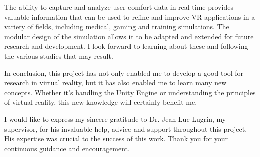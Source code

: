 \documentclass[american]{acmtog} %
\begin{document}
The ability to capture and analyze user comfort data in real time provides valuable information that can be used to refine and improve VR applications in a variety of fields, including medical, gaming and training simulations. The modular design of the simulation allows it to be adapted and extended for future research and development. I look forward to learning about these and following the various studies that may result.

In conclusion, this project has not only enabled me to develop a good tool for research in virtual reality, but it has also enabled me to learn many new concepts. Whether it's handling the Unity Engine or understanding the principles of virtual reality, this new knowledge will certainly benefit me.

\begin{acks}
I would like to express my sincere gratitude to Dr. Jean-Luc Lugrin, my supervisor, for his invaluable help, advice and support throughout this project. His expertise was crucial to the success of this work. Thank you for your continuous guidance and encouragement.
\end{acks}

\listoffigures

\printbibliography
\end{document}
